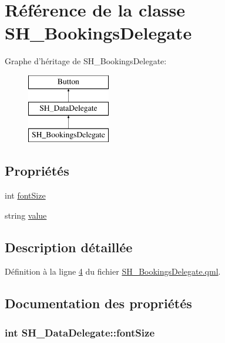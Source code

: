 \hypertarget{classSH__BookingsDelegate}{\section{Référence de la classe S\-H\-\_\-\-Bookings\-Delegate}
\label{classSH__BookingsDelegate}
}
Graphe d'héritage de S\-H\-\_\-\-Bookings\-Delegate\-:\begin{figure}[H]
\begin{center}
\leavevmode
\includegraphics[height=3.000000cm]{classSH__BookingsDelegate}
\end{center}
\end{figure}
\subsection*{Propriétés}
\begin{DoxyCompactItemize}
\item 
int \hyperlink{classSH__DataDelegate_afbb41ad9b513c7f27e7b5ad90d82e95b}{font\-Size}
\item 
string \hyperlink{classSH__DataDelegate_acb9da3c73493c88865e08d9575f26482}{value}
\end{DoxyCompactItemize}


\subsection{Description détaillée}


Définition à la ligne \hyperlink{SH__BookingsDelegate_8qml_source_l00004}{4} du fichier \hyperlink{SH__BookingsDelegate_8qml_source}{S\-H\-\_\-\-Bookings\-Delegate.\-qml}.



\subsection{Documentation des propriétés}
\hypertarget{classSH__DataDelegate_afbb41ad9b513c7f27e7b5ad90d82e95b}{
\subsubsection[{font\-Size}]{\setlength{\rightskip}{0pt plus 5cm}int S\-H\-\_\-\-Data\-Delegate\-::font\-Size\hspace{0.3cm}{\ttfamily [inherited]}}}\label{classSH__DataDelegate_afbb41ad9b513c7f27e7b5ad90d82e95b}


